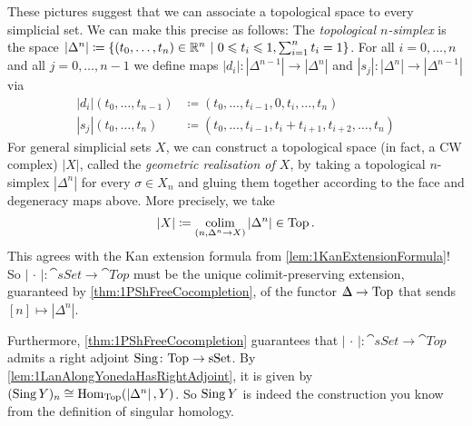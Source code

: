 \begin{numpar}\label{par:GeometricRealisation}
	These pictures suggest that we can associate a topological space to every simplicial set. We can make this precise as follows: The \emph{topological $n$-simplex} is the space $\left|\Delta^n\right|\coloneqq\left\{(t_0,\dotsc,t_n)\in\IR^n\ \middle|\ 0\leqslant t_i\leqslant 1, \sum_{i=1}^nt_i=1\right\}$. For all $i=0,\dotsc,n$ and all $j=0,\dotsc,n-1$ we define maps $\left|d_i\right|\colon\left|\Delta^{n-1}\right|\rightarrow\left|\Delta^n\right|$ and $\left|s_j\right|\colon\left|\Delta^{n}\right|\rightarrow\left|\Delta^{n-1}\right|$ via
	\begin{align*}
		\left|d_i\right|(t_0,\dotsc,t_{n-1})&\coloneqq (t_0,\dotsc,t_{i-1},0,t_i,\dotsc,t_n)\\
		\left|s_j\right|(t_0,\dotsc,t_n)&\coloneqq (t_0,\dotsc,t_{i-1},t_i+t_{i+1},t_{i+2},\dotsc,t_n)
	\end{align*}
	For general simplicial sets $X$, we can construct a topological space (in fact, a CW complex) $\left|X\right|$, called the \emph{geometric realisation of $X$}, by taking a topological $n$-simplex $\left|\Delta^n\right|$ for every $\sigma\in X_n$ and gluing them together according to the face and degeneracy maps above. More precisely, we take
	\begin{equation*}
		\left|X\right|\coloneqq\operatorname*{colim}_{(n,\Delta^n\rightarrow X)}\left|\Delta^n\right|\in\mathrm{Top}\,.
	\end{equation*}
	This agrees with the Kan extension formula from \cref{lem:1KanExtensionFormula}! So $\left|\,\cdot\,\right|\colon \cat{sSet}\rightarrow \cat{Top}$ must be the unique colimit-preserving extension, guaranteed by \cref{thm:1PShFreeCocompletion}, of the functor $\IDelta\rightarrow\cat{Top}$ that sends $[n]\mapsto \left|\Delta^n\right|$.
	
	Furthermore, \cref{thm:1PShFreeCocompletion} guarantees that $\left|\,\cdot\,\right|\colon \cat{sSet}\rightarrow \cat{Top}$ admits a right adjoint $\operatorname{Sing}\colon \mathrm{Top}\rightarrow\mathrm{sSet}$. By \cref{lem:1LanAlongYonedaHasRightAdjoint}, it is given by $(\operatorname{Sing} Y)_n\cong \operatorname{Hom}_{\mathrm{Top}}(\left|\Delta^n\right|,Y)$. So $\operatorname{Sing} Y$ is indeed the construction you know from the definition of singular homology.
\end{numpar}
